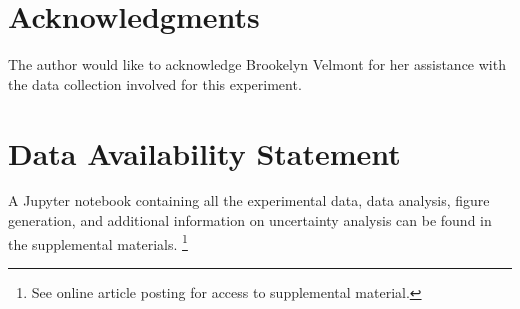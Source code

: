 \documentclass[rc]{physicsinprogress}
\begin{document}
\section*{Acknowledgments}
The author would like to acknowledge Brookelyn Velmont for her assistance with the data collection involved for this experiment. 

\section*{Data Availability Statement}
A Jupyter notebook containing all the experimental data, data analysis, figure generation, and additional information on uncertainty analysis can be found in the supplemental materials. \footnote{See online article posting for access to supplemental material.}

\end{document}
